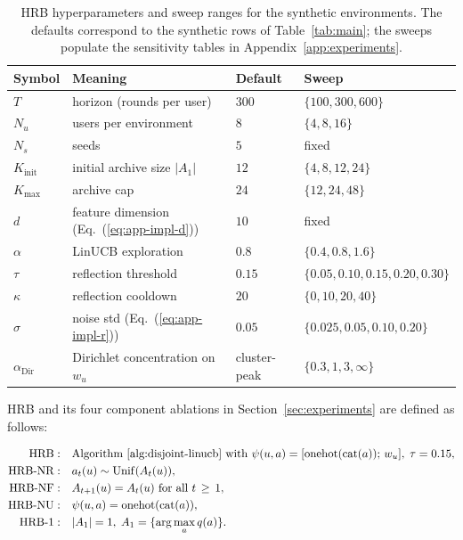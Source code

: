 \documentclass{article} %
\renewcommand{\eqref}[1]{\textup{(\ref{#1})}}
\begin{document}
\begin{table}[h]
\centering
\small
\caption{HRB hyperparameters and sweep ranges for the synthetic environments. The defaults correspond to the synthetic rows of Table~\ref{tab:main}; the sweeps populate the sensitivity tables in Appendix~\ref{app:experiments}.}
\label{tab:app-impl-hparams}
\begin{tabular}{llll}
\toprule
Symbol & Meaning & Default & Sweep \\
\midrule
$T$ & horizon (rounds per user) & $300$ & $\{100, 300, 600\}$ \\
$N_u$ & users per environment & $8$ & $\{4, 8, 16\}$ \\
$N_s$ & seeds & $5$ & fixed \\
$K_{\text{init}}$ & initial archive size $|A_1|$ & $12$ & $\{4, 8, 12, 24\}$ \\
$K_{\max}$ & archive cap & $24$ & $\{12, 24, 48\}$ \\
$d$ & feature dimension (Eq.~\eqref{eq:app-impl-d}) & $10$ & fixed \\
$\alpha$ & LinUCB exploration & $0.8$ & $\{0.4, 0.8, 1.6\}$ \\
$\tau$ & reflection threshold & $0.15$ & $\{0.05, 0.10, 0.15, 0.20, 0.30\}$ \\
$\kappa$ & reflection cooldown & $20$ & $\{0, 10, 20, 40\}$ \\
$\sigma$ & noise std (Eq.~\eqref{eq:app-impl-r}) & $0.05$ & $\{0.025, 0.05, 0.10, 0.20\}$ \\
$\alpha_{\mathrm{Dir}}$ & Dirichlet concentration on $w_u$ & cluster-peak & $\{0.3, 1, 3, \infty\}$ \\
\bottomrule
\end{tabular}

\end{table}

HRB and its four component ablations in Section~\ref{sec:experiments} are defined as follows:

\begin{align}
\label{eq:app-impl-abl-full}
\textnormal{HRB} :&\quad \text{Algorithm~\ref{alg:disjoint-linucb} with } \psi(u,a) = [\mathrm{onehot}(\mathrm{cat}(a));\, w_u],\; \tau=0.15,\\
\label{eq:app-impl-abl-noroute}
\textnormal{HRB-NR} :&\quad a_t(u) \sim \mathrm{Unif}(A_t(u)),\\
\label{eq:app-impl-abl-noref}
\textnormal{HRB-NF} :&\quad A_{t+1}(u) = A_t(u) \text{ for all } t \,\ge\, 1,\\
\label{eq:app-impl-abl-nopers}
\textnormal{HRB-NU} :&\quad \psi(u,a) = \mathrm{onehot}(\mathrm{cat}(a)),\\
\label{eq:app-impl-abl-coll1}
\textnormal{HRB-1} :&\quad |A_1| = 1,\; A_1 = \{\arg\max_{a} q(a)\}.
\end{align}
\end{document}

